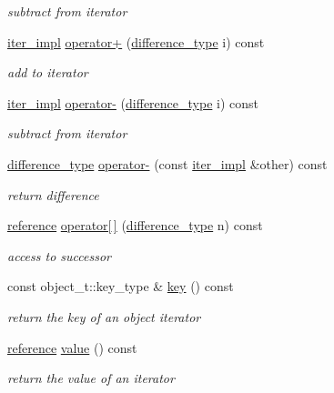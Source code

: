 \begin{DoxyCompactItemize}
\begin{DoxyCompactList}\small\item\em subtract from iterator \end{DoxyCompactList}\item 
\hyperlink{classnlohmann_1_1detail_1_1iter__impl}{iter\+\_\+impl} \hyperlink{classnlohmann_1_1detail_1_1iter__impl_a8ef76aeb5a5032768f0f61f48ac189c0}{operator+} (\hyperlink{classnlohmann_1_1detail_1_1iter__impl_a2f7ea9f7022850809c60fc3263775840}{difference\+\_\+type} i) const
\begin{DoxyCompactList}\small\item\em add to iterator \end{DoxyCompactList}\item 
\hyperlink{classnlohmann_1_1detail_1_1iter__impl}{iter\+\_\+impl} \hyperlink{classnlohmann_1_1detail_1_1iter__impl_a0dd9c415b94a02ff2aa25da75e52da30}{operator-\/} (\hyperlink{classnlohmann_1_1detail_1_1iter__impl_a2f7ea9f7022850809c60fc3263775840}{difference\+\_\+type} i) const
\begin{DoxyCompactList}\small\item\em subtract from iterator \end{DoxyCompactList}\item 
\hyperlink{classnlohmann_1_1detail_1_1iter__impl_a2f7ea9f7022850809c60fc3263775840}{difference\+\_\+type} \hyperlink{classnlohmann_1_1detail_1_1iter__impl_a49bf3e708a9c1c88c415011735962d06}{operator-\/} (const \hyperlink{classnlohmann_1_1detail_1_1iter__impl}{iter\+\_\+impl} \&other) const
\begin{DoxyCompactList}\small\item\em return difference \end{DoxyCompactList}\item 
\hyperlink{classnlohmann_1_1detail_1_1iter__impl_a5be8001be099c6b82310f4d387b953ce}{reference} \hyperlink{classnlohmann_1_1detail_1_1iter__impl_ac0b9276f1102ed4b9cd3f5f56287e3ce}{operator\mbox{[}$\,$\mbox{]}} (\hyperlink{classnlohmann_1_1detail_1_1iter__impl_a2f7ea9f7022850809c60fc3263775840}{difference\+\_\+type} n) const
\begin{DoxyCompactList}\small\item\em access to successor \end{DoxyCompactList}\item 
const object\+\_\+t\+::key\+\_\+type \& \hyperlink{classnlohmann_1_1detail_1_1iter__impl_a15dfb2744fed2ef40c12a9e9a20d6dbc}{key} () const
\begin{DoxyCompactList}\small\item\em return the key of an object iterator \end{DoxyCompactList}\item 
\hyperlink{classnlohmann_1_1detail_1_1iter__impl_a5be8001be099c6b82310f4d387b953ce}{reference} \hyperlink{classnlohmann_1_1detail_1_1iter__impl_ab447c50354c6611fa2ae0100ac17845c}{value} () const
\begin{DoxyCompactList}\small\item\em return the value of an iterator \end{DoxyCompactList}\end{DoxyCompactItemize}
